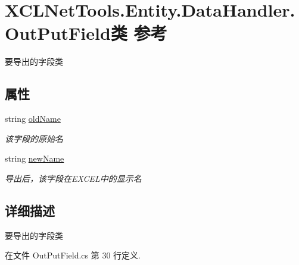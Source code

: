 \hypertarget{class_x_c_l_net_tools_1_1_entity_1_1_data_handler_1_1_out_put_field}{\section{X\-C\-L\-Net\-Tools.\-Entity.\-Data\-Handler.\-Out\-Put\-Field类 参考}
\label{class_x_c_l_net_tools_1_1_entity_1_1_data_handler_1_1_out_put_field}
}


要导出的字段类  


\subsection*{属性}
\begin{DoxyCompactItemize}
\item 
string \hyperlink{class_x_c_l_net_tools_1_1_entity_1_1_data_handler_1_1_out_put_field_ad5c016e692d53fd511a7b0c8b4128f6d}{old\-Name}
\begin{DoxyCompactList}\small\item\em 该字段的原始名 \end{DoxyCompactList}\item 
string \hyperlink{class_x_c_l_net_tools_1_1_entity_1_1_data_handler_1_1_out_put_field_a1c47e24e0ff96b1a80e738c93a8c877d}{new\-Name}
\begin{DoxyCompactList}\small\item\em 导出后，该字段在\-E\-X\-C\-E\-L中的显示名 \end{DoxyCompactList}\end{DoxyCompactItemize}


\subsection{详细描述}
要导出的字段类 



在文件 Out\-Put\-Field.\-cs 第 30 行定义.



